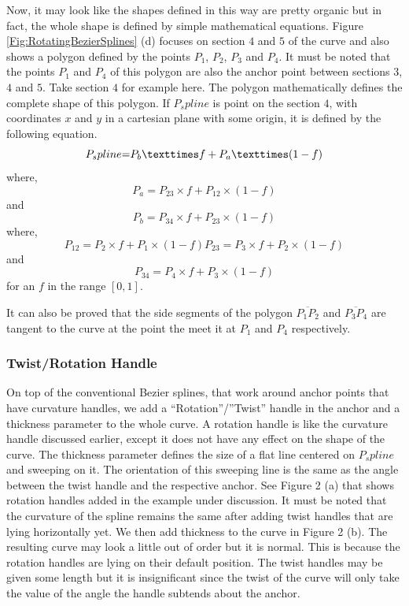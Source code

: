         Now, it may look like the shapes defined in this way are pretty organic but in fact, the whole shape is defined by simple mathematical equations. Figure \ref{Fig:RotatingBezierSplines} (d) focuses on section $4$ and $5$ of the curve and also shows a polygon defined by the points $P_1$, $P_2$, $P_3$ and  $P_4$. It must be noted that the points $P_1$ and $P_4$ of this polygon are also the anchor point between sections $3$, $4$ and $5$. Take section $4$ for example here. The polygon mathematically defines the complete shape of this polygon. If $P_spline$ is point on the section $4$, with coordinates $x$ and $y$ in a cartesian plane with some origin, it is defined by the following equation.
         \begin{equation}
         P_spline$$=$$P_b×f+P_a×(1 -f)
         \end{equation}
where,
\begin{equation}
P_a=P_23×f+P_12×(1 -f)
\end{equation}
and
\begin{equation}
P_b=P_34×f+P_23×(1 -f)
\end{equation}
where,
\begin{equation}
P_12=P_2×f+P_1×(1 -f)
P_23=P_3×f+P_2×(1 -f)
\end{equation}
and
\begin{equation}
P_34=P_4×f+P_3×(1 -f)
\end{equation}
for an $f$ in the range $[0, 1]$.

It can also be proved that the side segments of the polygon $\overline{P_1 P_2}$ and $\overline{P_3 P_4}$ are tangent to the curve at the point the meet it at $P_1$ and $P_4$ respectively.


\subsubsection{Twist/Rotation Handle}
    On top of the conventional Bezier splines, that work around anchor points that have curvature handles, we add a “Rotation”/”Twist” handle in the anchor and a thickness parameter to the whole curve. A rotation handle is like the curvature handle discussed earlier, except it does not have any effect on the shape of the curve. The thickness parameter defines the size of a flat line centered on $P_spline$ and sweeping on it. The orientation of this sweeping line is the same as the angle between the twist handle and the respective anchor. See Figure 2 (a) that shows rotation handles added in the example under discussion. It must be noted that the curvature of the spline remains the same after adding twist handles that are lying horizontally yet. We then add thickness to the curve in Figure 2 (b). The resulting curve may look a little out of order but it is normal. This is because the rotation handles are lying on their default position. The twist handles may be given some length but it is insignificant since the twist of the curve will only take the value of the angle the handle subtends about the anchor.

